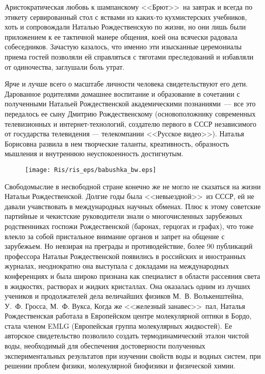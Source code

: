 Аристократическая любовь к шампанскому <<Брют>>\ на завтрак и всегда по этикету сервированный стол с яствами из каких-то кухмистерских учебников, хоть и сопровождали Наталью Рождественскую по жизни, но они лишь были приложением к ее тактичной манере общения, коей она всячески радовала собеседников. Зачастую казалось, что именно эти изысканные церемониалы приема гостей позволяли ей справляться с тяготами преследований и избавляли от одиночества, заглушали боль утрат.

\thispagestyle{myheadings}

Ярче и лучше всего о масштабе личности человека свидетельствуют его дети. Дарованное родителями домашнее воспитание и образование в сочетании с полученными Натальей Рождественской академическими познаниями~--- все это передалось ее сыну Дмитрию Рождественскому (основоположнику современных телевизионных и интернет-технологий, создателю первого в СССР независимого от государства телевидения --- телекомпании <<Русское видео>>). Наталья Борисовна развила в нем творческие таланты, креативность, образность мышления и внутреннюю неуспокоенность достигнутым.

\begin{figure}[tbp]
\centerline{\hbox{\texttt{[image: Ris/ris\_eps/babushka\_bw.eps]}}}
\end{figure}

Свободомыслие в несвободной стране конечно же не могло не сказаться на жизни Натальи Рождественской. Долгие годы была <<невыездной>>\ из СССР, ей не давали учавствовать в  международных научных обменах. Плюс к этому советские партийные и чекистские руководители знали о многочисленных зарубежных родственниках госпожи Рождественской (баронах, герцогах и графах), что тоже влекло за собой пристальное внимание органов и запрет на общение с зарубежьем. Но невзирая на преграды и противодействие, более 90 публикаций профессора Натальи Рождественской появились в российских и иностранных журналах, неоднократно она выступала с докладами на международных конференциях и была широко признана как специалист в области рассеяния света в жидкостях, растворах и жидких кристаллах. Она оказалась одним из лучших учеников и продолжателей дела величайших физиков М.~В. Волькенштейна, У.~Ф. Гросса, М.~Ф. Вукса, Когда же <<железный занавес>>\ пал, Наталья Рождественская работала в Европейском центре молекулярной оптики в Бордо, стала членом EMLG (Европейская группа молекулярных жидкостей). Ее авторское свидетельство позволило создать термодинамический эталон чистой воды, необходимый для обеспечения достоверности полученных экспериментальных результатов при изучении свойств воды и водных систем, при решении проблем физики, молекулярной биофизики и физической химии.

